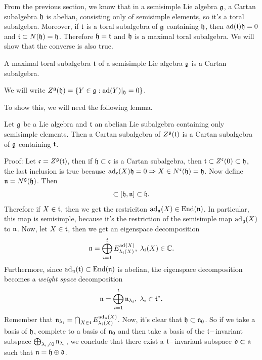 From the previous section, we know that in a semisimple Lie algebra $\mathfrak{g}$, a Cartan subalgebra $\mathfrak{h}$ is abelian, 
consisting only of semisimple elements, so it's a toral subalgebra.  
Moreover, if $\mathfrak{t}$ is a toral subalgebra of $\mathfrak{g}$ containing $\mathfrak{h}$, then $\text{ad}(\mathfrak{t})\mathfrak{h}=0$ and 
$\mathfrak{t}\subset N(\mathfrak{h})=\mathfrak{h}$. Therefore $\mathfrak{h}=\mathfrak{t}$ and $\mathfrak{h}$ is a maximal toral subalgebra. We will show 
that the converse is also true.
\begin{dang}
    \begin{theorem}
        A maximal toral subalgebra $\mathfrak{t}$ of a semisimple Lie algebra $\mathfrak{g}$ is a Cartan subalgebra.
    \end{theorem}
\end{dang}

\begin{dang}
    \begin{notation}
        We will write $Z^{\mathfrak{g}}(\mathfrak{h})=\{Y\in\mathfrak{g}:\text{ad}(Y)|_{\mathfrak{h}}=0\}$.
    \end{notation}
\end{dang}

To show this, we will need the following lemma.
\begin{dang}
    \begin{lemma}
        Let $\mathfrak{g}$ be a Lie algebra and $\mathfrak{t}$ 
        an abelian Lie subalgebra containing only semisimple elements. 
        Then a Cartan subalgebra of $Z^{\mathfrak{g}}(\mathfrak{t})$ is a Cartan subalgebra of $\mathfrak{g}$ containing $\mathfrak{t}$. 
    \end{lemma}
\end{dang}
Proof: Let $\mathfrak{c}=Z^{\mathfrak{g}}(\mathfrak{t})$, then if $\mathfrak{h}\subset\mathfrak{c}$ is a Cartan subalgebra, then 
$\mathfrak{t}\subset Z^{\mathfrak{c}}(0)\subset\mathfrak{h}$, the last inclusion is true because 
$\text{ad}_{\mathfrak{c}}(X)\mathfrak{h}=0\Rightarrow X\in N^{\mathfrak{c}}(\mathfrak{h})=\mathfrak{h}$. Now define $\mathfrak{n}=N^{\mathfrak{g}}(\mathfrak{h})$. Then 
\begin{equation}
    [\fr{t},\fr{n}]\subset[\fr{h},\fr{n}]\subset \fr{h}.
\end{equation}
Therefore if $X\in\mathfrak{t}$, then we get the restriciton $\text{ad}_{\mathfrak{n}}(X)\in\text{End}(\mathfrak{n})$. In particular, this map is 
semisimple, because it's the restriction of the semisimple map $\text{ad}_{\mathfrak{g}}(X)$ to $\mathfrak{n}$. 
Now, let $X\in\mathfrak{t}$, then we get an eigenspace decomposition 
\begin{equation}
    \mathfrak{n}=\bigoplus_{i=1}^t E_{\lambda_i(X)}^{\text{ad}(X)},\;\lambda_i(X)\in\mathbb{C}.
\end{equation} 
Furthermore, since 
$\text{ad}_{\mathfrak{n}}(\mathfrak{t})\subset \text{End}(\mathfrak{n})$ is abelian, the eigenspace decomposition becomes a \textit{weight space}
decomposition 
\begin{equation}
    \mathfrak{n}=\bigoplus_{i=1}^t\mathfrak{n}_{\lambda_i},\;\lambda_i\in\mathfrak{t}^*.
\end{equation}
Remember that $\mathfrak{n}_{\lambda_i}=\bigcap_{X\in\mathfrak{t}}E_{\lambda_i(X)}^{\text{ad}_{\mathfrak{n}}(X)}$. Now, it's clear that 
$\mathfrak{h}\subset \mathfrak{n}_0$. So if we take a basis of $\mathfrak{h}$, complete to a basis of $\mathfrak{n}_0$ and then take 
a basis of the $\mathfrak{t}-$invariant subspace $\bigoplus_{\lambda_i\neq0}\mathfrak{n}_{\lambda_i}$, we conclude that 
there exist a $\mathfrak{t}-$invariant subspace $\mathfrak{d}\subset\mathfrak{n}$ such that $\mathfrak{n}=\mathfrak{h}\oplus\mathfrak{d}$. 

